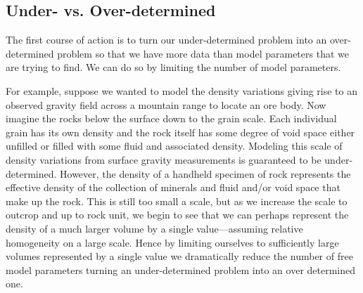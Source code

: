 
\subsection{Under- vs. Over-determined}
The first course of action is to turn our under-determined problem into an over-determined problem so that we have more data than model parameters that we are trying to find.  We can do so by limiting the number of model parameters.

For example, suppose we wanted to model the density variations giving rise to an observed gravity field across a mountain range to locate an ore body.  Now imagine the rocks below the surface down to the grain scale.  Each individual grain has its own density and the rock itself has some degree of void space either unfilled or filled with some fluid and associated density.  Modeling this scale of density variations from surface gravity measurements is guaranteed to be under-determined.  However, the density of a handheld specimen of rock represents the effective density of the collection of minerals and fluid and/or void space that make up the rock.  This is still too small a scale, but as we increase the scale to outcrop and up to rock unit, we begin to see that we can perhaps represent the density of a much larger volume by a single value---assuming relative homogeneity on a large scale.  Hence by limiting ourselves to sufficiently large volumes represented by a single value we dramatically reduce the number of free model parameters turning an under-determined problem into an over determined one.

